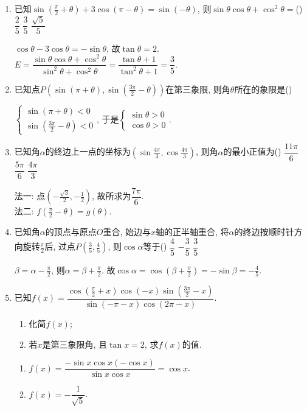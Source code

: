 \begin{enumerate}
\item 已知$\sin(\frac{\pi}{2}+\theta)+3\cos(\pi-\theta)=\sin(-\theta)$, 则$\sin\theta\cos\theta+\cos^2\theta=$\dotfill()
{$\dfrac{2}{5}$}
{$\dfrac{3}{5}$}
{$\dfrac{\sqrt5}{5}$}
\begin{jieda}
$\cos\theta-3\cos\theta=-\sin\theta$, 故$\tan\theta=2$. \\
$E=\dfrac{\sin\theta\cos\theta+\cos^2\theta}{\sin^2\theta+\cos^2\theta}=\dfrac{\tan\theta+1}{\tan^2\theta+1}=\dfrac{3}{5}$. 
\end{jieda}

\item 已知点$P(\sin(\pi+\theta),\sin(\frac{3\pi}{2}-\theta))$在第三象限, 则角$\theta$所在的象限是\dotfill()
\begin{jieda}
$\begin{cases}
\sin(\pi+\theta)<0\\
\sin(\frac{3\pi}{2}-\theta)<0
\end{cases}$, 
于是$\begin{cases}
\sin\theta>0\\
\cos\theta>0
\end{cases}$. 
\end{jieda}


\item 已知角$\alpha$的终边上一点的坐标为$(\sin\frac{4\pi}{3},\cos\frac{4\pi}{3})$, 则角$\alpha$的最小正值为\dotfill()
{$\dfrac{11\pi}{6}$}
{$\dfrac{5\pi}{6}$}
{$\dfrac{4\pi}{3}$}
\begin{jieda}
法一: 点$(-\frac{\sqrt{3}}{2},-\frac{1}{2})$, 故所求为$\dfrac{7\pi}{6}$. \\
法二: $f(\frac{\pi}{2}-\theta)=g(\theta)$. 
\end{jieda}

\item 已知角$\alpha$的顶点与原点$O$重合, 始边与$x$轴的正半轴重合, 将$\alpha$的终边按顺时针方向旋转$\frac{\pi}{2}$后, 
过点$P(\frac{3}{5},\frac{4}{5})$, 则$\cos\alpha$等于\dotfill()
{$\dfrac{4}{5}$}
{$-\dfrac{3}{5}$}
{$\dfrac{3}{5}$}
\begin{jieda}
$\beta=\alpha-\frac{\pi}{2}$, 则$\alpha=\beta+\frac{\pi}{2}$. 
故$\cos\alpha=\cos(\beta+\frac{\pi}{2})=-\sin\beta=-\frac{4}{5}$. 
\end{jieda}

\item 已知$f(x)=\dfrac{\cos(\frac{\pi}{2}+x)\cos(-x)\sin(\frac{3\pi}{2}-x)}{\sin(-\pi-x)\cos(2\pi-x)}$. 
\begin{enumerate}[(1)]
\item 化简$f(x)$; 
\item 若$x$是第三象限角, 且$\tan{x}=2$, 求$f(x)$的值. 
\end{enumerate}
\begin{jieda}
\begin{enumerate}[(1)]
\item $f(x)=\dfrac{-\sin{x}\cos{x}(-\cos{x})}{\sin{x}\cos{x}}=\cos{x}$. 
\item $f(x)=-\dfrac{1}{\sqrt{5}}$. 
\end{enumerate}
\end{jieda}



\end{enumerate}
